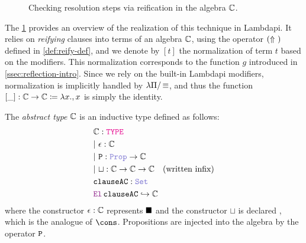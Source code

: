 \begin{figure}[t]
  \centering
  \caption{Checking resolution steps via reification in the algebra $\bb{C}$.}
  \label{fig:reflective-process}
\end{figure}

The \cref{fig:reflective-process} provides an overview of the realization of this technique in Lambdapi.
It relies on \emph{reifying} clauses into terms of an algebra $\bb{C}$, using the operator $\reify{}$ defined in \cref{def:reify-def},
and we denote by $[t]$ the normalization of term $t$ based on the  modifiers.
This normalization corresponds to the function $g$ introduced in \cref{ssec:reflection-intro}.
Since we rely on the built-in Lambdapi modifiers, normalization is implicitly handled by $\lpm$, and thus the function $[\_]: \bb{C} \rightarrow \bb{C} \coloneq \lambda x., x$ is simply the identity.

\begin{definition}
The \emph{abstract type} $\bb{C}$ is an inductive type defined as follows:
\begin{align*}
&\bb{C} : \type \\
&|~\eps: \bb{C} \\
&|~\kw{P}: \prop \ra \bb{C} \\
&|~\sqcup: \bb{C} \ra \bb{C} \ra \bb{C} \quad \text{(written infix)} \\
&\kw{clauseAC} : \set \\
&\el\, \kw{clauseAC} \re \bb{C} \\
\end{align*}
where the constructor $\eps: \bb{C}$ represents $\nil$ and the constructor $\sqcup$ is declared , which is the analogue of $\cons$.
Propositions are injected into the algebra by the operator $\tt{P}$.
\end{definition}

